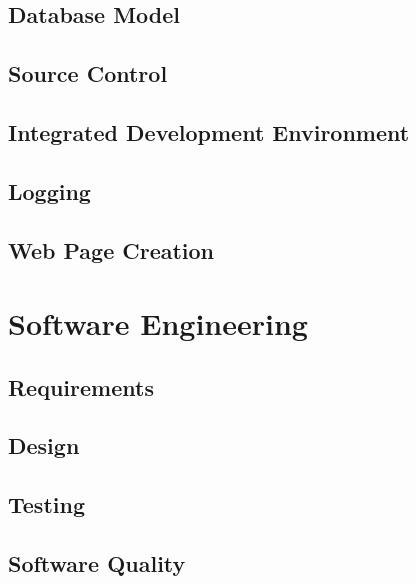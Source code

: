 \subsection{Database Model}

\subsection{Source Control}

\subsection{Integrated Development Environment}

\subsection{Logging}

\subsection{Web Page Creation}

\section{Software Engineering}

\subsection{Requirements}

\subsection{Design}

\subsection{Testing}

\subsection{Software Quality}	